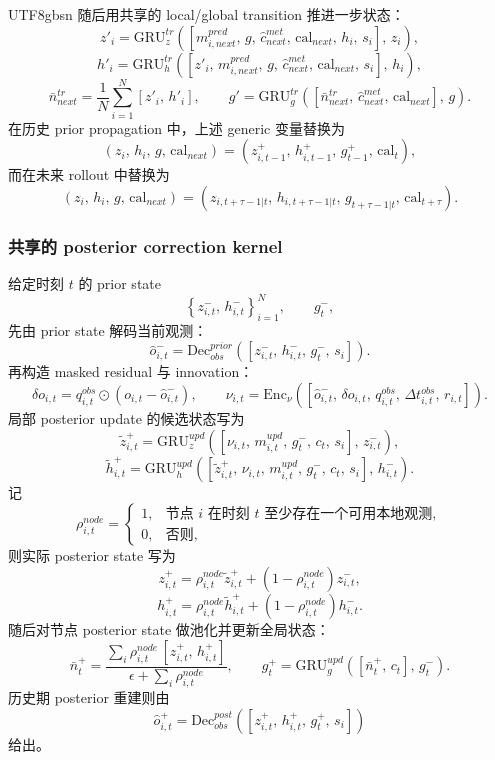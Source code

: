 \documentclass[11pt]{article}
\begin{document}
\begin{CJK}{UTF8}{gbsn}
随后用共享的 local/global transition 推进一步状态：
\[
z'_i=\mathrm{GRU}^{tr}_z\left([m^{pred}_{i,next},\, g,\, \hat c^{met}_{next},\, \mathrm{cal}_{next},\, h_i,\, s_i],\, z_i\right),
\]
\[
h'_i=\mathrm{GRU}^{tr}_h\left([z'_i,\, m^{pred}_{i,next},\, g,\, \hat c^{met}_{next},\, \mathrm{cal}_{next},\, s_i],\, h_i\right),
\]
\[
\bar n^{tr}_{next}=\frac{1}{N}\sum_{i=1}^{N}[z'_i,\, h'_i],\qquad
g'=\mathrm{GRU}^{tr}_g\left([\bar n^{tr}_{next},\, \hat c^{met}_{next},\, \mathrm{cal}_{next}],\, g\right).
\]
\noindent 在历史 prior propagation 中，上述 generic 变量替换为
\[
(z_i,\, h_i,\, g,\, \mathrm{cal}_{next})=(z^+_{i,t-1},\, h^+_{i,t-1},\, g^+_{t-1},\, \mathrm{cal}_{t}),
\]
而在未来 rollout 中替换为
\[
(z_i,\, h_i,\, g,\, \mathrm{cal}_{next})=(z_{i,t+\tau-1|t},\, h_{i,t+\tau-1|t},\, g_{t+\tau-1|t},\, \mathrm{cal}_{t+\tau}).
\]

\subsubsection{共享的 posterior correction kernel}
给定时刻 $t$ 的 prior state
\[
\left\{z^-_{i,t},\, h^-_{i,t}\right\}_{i=1}^N,\qquad g_t^-,
\]
先由 prior state 解码当前观测：
\[
\hat o^-_{i,t}=\mathrm{Dec}^{prior}_{obs}\left([z^-_{i,t},\, h^-_{i,t},\, g_t^-,\, s_i]\right).
\]
再构造 masked residual 与 innovation：
\[
\delta o_{i,t}=q^{obs}_{i,t}\odot\left(o_{i,t}-\hat o^-_{i,t}\right),
\qquad
\nu_{i,t}=\mathrm{Enc}_{\nu}\left([\hat o^-_{i,t},\, \delta o_{i,t},\, q^{obs}_{i,t},\, \Delta t^{obs}_{i,t},\, r_{i,t}]\right).
\]
局部 posterior update 的候选状态写为
\[
\tilde z^+_{i,t}=\mathrm{GRU}^{upd}_z\left([\nu_{i,t},\, m^{upd}_{i,t},\, g_t^-,\, c_t,\, s_i],\, z^-_{i,t}\right),
\]
\[
\tilde h^+_{i,t}=\mathrm{GRU}^{upd}_h\left([\tilde z^+_{i,t},\, \nu_{i,t},\, m^{upd}_{i,t},\, g_t^-,\, c_t,\, s_i],\, h^-_{i,t}\right).
\]
记
\[
\rho^{node}_{i,t}=
\begin{cases}
1, & \text{节点 } i \text{ 在时刻 } t \text{ 至少存在一个可用本地观测},\\
0, & \text{否则},
\end{cases}
\]
则实际 posterior state 写为
\[
z^+_{i,t}=\rho^{node}_{i,t}\tilde z^+_{i,t}+\left(1-\rho^{node}_{i,t}\right)z^-_{i,t},
\]
\[
h^+_{i,t}=\rho^{node}_{i,t}\tilde h^+_{i,t}+\left(1-\rho^{node}_{i,t}\right)h^-_{i,t}.
\]
随后对节点 posterior state 做池化并更新全局状态：
\[
\bar n_t^+=\frac{\sum_i \rho^{node}_{i,t}\,[z^+_{i,t},\, h^+_{i,t}]}{\epsilon+\sum_i \rho^{node}_{i,t}},\qquad
g_t^+=\mathrm{GRU}^{upd}_g\left([\bar n_t^+,\, c_t],\, g_t^-\right).
\]
历史期 posterior 重建则由
\[
\hat o^+_{i,t}=\mathrm{Dec}^{post}_{obs}\left([z^+_{i,t},\, h^+_{i,t},\, g_t^+,\, s_i]\right)
\]
给出。


\end{CJK}
\end{document}
